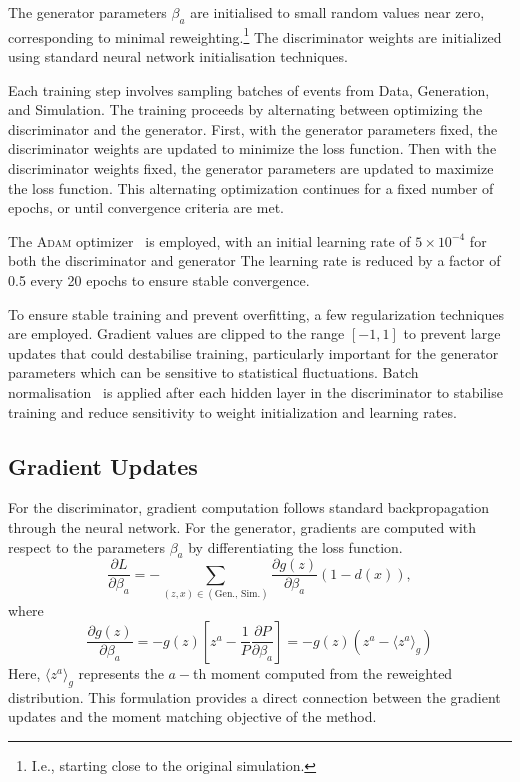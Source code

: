         The generator parameters $\beta_a$ are initialised to small random values near zero, corresponding to minimal reweighting.\footnote{I.e., starting close to the original simulation.}
        The discriminator weights are initialized using standard neural network initialisation techniques\cite{7410480}.
        
        Each training step involves sampling batches of events from Data, Generation, and Simulation.
        The training proceeds by alternating between optimizing the discriminator and the generator.
        First, with the generator parameters fixed, the discriminator weights are updated to minimize the loss function.
        Then with the discriminator weights fixed, the generator parameters are updated to maximize the loss function.
        This alternating optimization continues for a fixed number of epochs, or until convergence criteria are met.

        The \textsc{Adam} optimizer~\cite{kingma_adam_2017} is employed, with an initial learning rate of $5 \times 10^{-4}$ for both the discriminator and generator
        The learning rate is reduced by a factor of 0.5 every 20 epochs to ensure stable convergence.

        To ensure stable training and prevent overfitting, a few regularization techniques are employed.
        Gradient values are clipped to the range $[-1, 1]$ to prevent large updates that could destabilise training, particularly important for the generator parameters which can be sensitive to statistical fluctuations.
        Batch normalisation~\cite{Ioffe2015BatchShift} is applied after each hidden layer in the discriminator to stabilise training and reduce sensitivity to weight initialization and learning rates.
    \subsection{Gradient Updates}
        For the discriminator, gradient computation follows standard backpropagation through the neural network.
        For the generator, gradients are computed with respect to the parameters $\beta_a$ by differentiating the loss function.
        \[ 
            \frac{\partial L}{\partial \beta_a} = -\sum_{(z,x) \in (\text{Gen., Sim.})} \frac{\partial g(z)}{\partial \beta_a}(1-d(x)),
        \]
        where
        \[
            \frac{\partial g(z)}{\partial \beta_a} = -g(z)\left[z^a - \frac{1}{P}\frac{\partial P}{\partial \beta_a}\right] = -g(z)(z^a - \langle z^a \rangle_{g})
        \]
        Here, $\langle z^a \rangle_{g}$ represents the $a-$th moment computed from the reweighted distribution.
        This formulation provides a direct connection between the gradient updates and the moment matching objective of the method.
        
